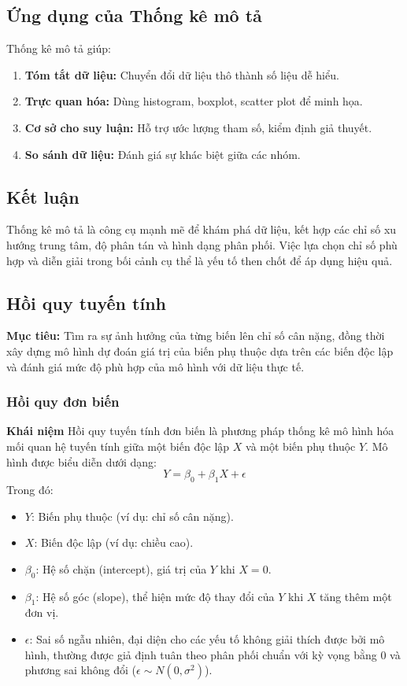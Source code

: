 \documentclass[a4paper,12pt]{article}
\begin{document}
\subsection*{Ứng dụng của Thống kê mô tả}
Thống kê mô tả giúp:
\begin{enumerate}
    \item \textbf{Tóm tắt dữ liệu:} Chuyển đổi dữ liệu thô thành số liệu dễ hiểu.
    \item \textbf{Trực quan hóa:} Dùng histogram, boxplot, scatter plot để minh họa.
    \item \textbf{Cơ sở cho suy luận:} Hỗ trợ ước lượng tham số, kiểm định giả thuyết.
    \item \textbf{So sánh dữ liệu:} Đánh giá sự khác biệt giữa các nhóm.
\end{enumerate}

\subsection*{Kết luận}
Thống kê mô tả là công cụ mạnh mẽ để khám phá dữ liệu, kết hợp các chỉ số xu hướng trung tâm, độ phân tán và hình dạng phân phối. Việc lựa chọn chỉ số phù hợp và diễn giải trong bối cảnh cụ thể là yếu tố then chốt để áp dụng hiệu quả.
\subsection*{Hồi quy tuyến tính}
\textbf{Mục tiêu:} Tìm ra sự ảnh hưởng của từng biến lên chỉ số cân nặng, đồng thời xây dựng mô hình dự đoán giá trị của biến phụ thuộc dựa trên các biến độc lập và đánh giá mức độ phù hợp của mô hình với dữ liệu thực tế.

\subsubsection*{Hồi quy đơn biến}
\textbf{Khái niệm}  
Hồi quy tuyến tính đơn biến là phương pháp thống kê mô hình hóa mối quan hệ tuyến tính giữa một biến độc lập \(X\) và một biến phụ thuộc \(Y\). Mô hình được biểu diễn dưới dạng:  
\begin{equation}
    Y = \beta_0 + \beta_1 X + \epsilon
\end{equation}
Trong đó:  
\begin{itemize}
    \item \(Y\): Biến phụ thuộc (ví dụ: chỉ số cân nặng).  
    \item \(X\): Biến độc lập (ví dụ: chiều cao).  
    \item \(\beta_0\): Hệ số chặn (intercept), giá trị của \(Y\) khi \(X = 0\).  
    \item \(\beta_1\): Hệ số góc (slope), thể hiện mức độ thay đổi của \(Y\) khi \(X\) tăng thêm một đơn vị.  
    \item \(\epsilon\): Sai số ngẫu nhiên, đại diện cho các yếu tố không giải thích được bởi mô hình, thường được giả định tuân theo phân phối chuẩn với kỳ vọng bằng 0 và phương sai không đổi (\(\epsilon \sim N(0, \sigma^2)\)).
\end{itemize}
\end{document}
